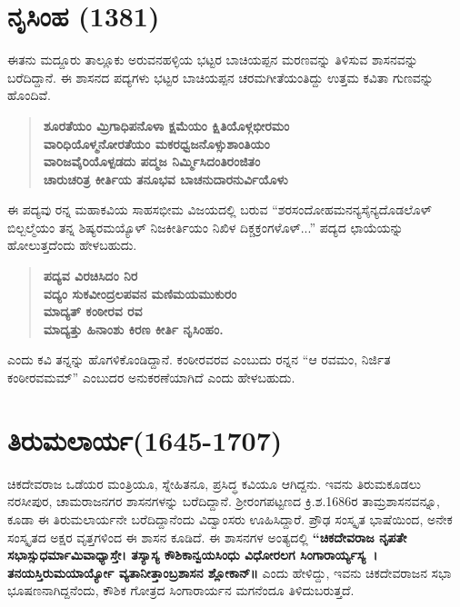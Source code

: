 \section*{ನೃಸಿಂಹ (1381)}

ಈತನು ಮದ್ದೂರು ತಾಲ್ಲೂಕು ಅರುವನಹಳ್ಳಿಯ ಭಟ್ಟರ ಬಾಚಿಯಪ್ಪನ ಮರಣವನ್ನು ತಿಳಿಸುವ ಶಾಸನವನ್ನು ಬರೆದಿದ್ದಾನೆ. ಈ ಶಾಸನದ ಪದ್ಯಗಳು ಭಟ್ಟರ ಬಾಚಿಯಪ್ಪನ ಚರಮಗೀತೆಯಂತಿದ್ದು ಉತ್ತಮ ಕವಿತಾ ಗುಣವನ್ನು ಹೊಂದಿವೆ.

\begin{verse}
\textbf{ಶೂರತೆಯಂ ಮ್ರಿಗಾಧಿಪನೊಳಾ ಕ್ಷಮೆಯಂ ಕ್ಷಿತಿಯೊಳ್ಗಭೀರಮಂ} \\\textbf{ವಾರಿಧಿಯೊಳ್ಮನೋರತೆಯಂ ಮಕರಧ್ವಜನೊಳ್ಸುಶಾಂತಿಯಂ} \\\textbf{ವಾರಿಜವೈರಿಯೊಳ್ಪಡದು ಪದ್ಮಜ ನಿರ್ಮ್ಮಿಸಿದಂತಿರಂಜಿತಂ} \\\textbf{ಚಾರುಚರಿತ್ರ ಕೀರ್ತಿಯ ತನೂಭವ ಬಾಚನುದಾರನುರ್ವಿಯೊಳು}
\end{verse}

ಈ ಪದ್ಯವು ರನ್ನ ಮಹಾಕವಿಯ ಸಾಹಸಭೀಮ ವಿಜಯದಲ್ಲಿ ಬರುವ “ಶರಸಂದೋಹಮನನ್ಯಸೈನ್ಯದೊಡಲೊಳ್​ ಬಿಲ್ಬಲ್ಮೆಯಂ ತನ್ನ ಶಿಷ್ಯರಮಯ್ಯೊಳ್​ ನಿಜಕೀರ್ತಿಯಂ ನಿಖಿಳ ದಿಕ್ಚಕ್ರಂಗಳೊಳ್​...” ಪದ್ಯದ ಛಾಯೆಯನ್ನು ಹೋಲುತ್ತದೆಂದು ಹೇಳಬಹುದು.

\begin{verse}
\textbf{ಪದ್ಯವ ವಿರಚಿಸಿದಂ ನಿರ} \\\textbf{ವದ್ಯಂ ಸುಕವೀಂದ್ರಲಪವನ ಮಣಿಮಯಮುಕುರಂ} \\\textbf{ಮಾದ್ಯತ್​ ಕಂಠೀರವ ರವ} \\\textbf{ಮಾದ್ಯತ್ತು ಹಿನಾಂಶು ಕಿರಣ ಕೀರ್ತಿ ನೃಸಿಂಹಂ.}
\end{verse}

ಎಂದು ಕವಿ ತನ್ನನ್ನು ಹೊಗಳಿಕೊಂಡಿದ್ದಾನೆ. ಕಂಠೀರವರವ ಎಂಬುದು ರನ್ನನ “ಆ ರವಮಂ, ನಿರ್ಜಿತ ಕಂಠೀರವಮಮ್” ಎಂಬುದರ ಅನುಕರಣೆಯಾಗಿದೆ ಎಂದು ಹೇಳಬಹುದು.

\section*{ತಿರುಮಲಾರ್ಯ(1645-1707)}

ಚಿಕದೇವರಾಜ ಒಡೆಯರ ಮಂತ್ರಿಯೂ, ಸ್ನೇಹಿತನೂ, ಪ್ರಸಿದ್ಧ ಕವಿಯೂ ಆಗಿದ್ದನು. ಇವನು ತಿರುಮಕೂಡಲು ನರಸೀಪುರ, ಚಾಮರಾಜನಗರ ಶಾಸನಗಳನ್ನು ಬರೆದಿದ್ದಾನೆ. ಶ‍್ರೀರಂಗಪಟ್ಟಣದ ಕ್ರಿ.ಶ.1686ರ ತಾಮ್ರಶಾಸನವನ್ನೂ, ಕೂಡಾ ಈ ತಿರುಮಲಾರ್ಯನೇ ಬರೆದಿದ್ದಾನೆಂದು ವಿದ್ವಾಂಸರು ಊಹಿಸಿದ್ದಾರೆ. ಪ್ರೌಢ ಸಂಸ್ಕೃತ ಭಾಷೆಯಿಂದ, ಅನೇಕ ಸಂಸ್ಕೃತದ ಅಕ್ಷರ ವೃತ್ತಗಳಿಂದ ಈ ಶಾಸನ ಕೂಡಿದೆ. ಈ ಶಾಸನಗಳ ಅಂತ್ಯದಲ್ಲಿ \textbf{“ಚಿಕದೇವರಾಜ ನೃಪತೇ ಸಭಾಸ್ಸುಧರ್ಮಾಮಿವಾಧ್ಯಾಸ್ತೇ। ತಸ್ಯಾಸ್ಯ ಕೌಶಿಕಾನ್ವಯಸಿಂಧು ವಿಧೋರಲಗ ಸಿಂಗಾರಾರ್ಯ್ಯಸ್ಯ~। ತನಯಸ್ತಿರುಮಯಾರ್ಯ್ಯೋ ವ್ಯತಾನೀತ್ತಾಂಬ್ರಶಾಸನ ಶ್ಲೋಕಾನ್​॥} ಎಂದು ಹೇಳಿದ್ದು, ಇವನು ಚಿಕದೇವರಾಜನ ಸಭಾ ಭೂಷಣನಾಗಿದ್ದನೆಂದು, ಕೌಶಿಕ ಗೋತ್ರದ ಸಿಂಗಾರಾರ್ಯನ ಮಗನೆಂದೂ ತಿಳಿದುಬರುತ್ತದೆ.

